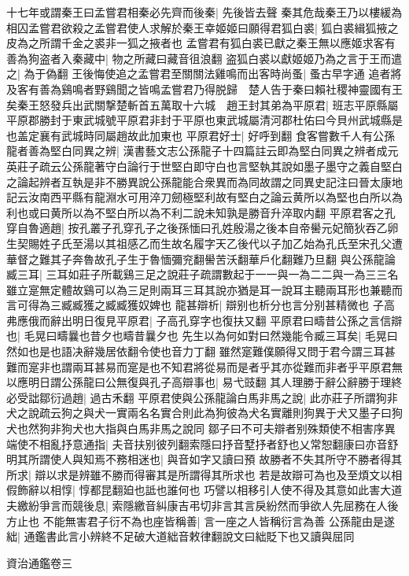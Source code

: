 十七年或謂秦王曰孟嘗君相秦必先齊而後秦|{
	先後皆去聲
	}
秦其危哉秦王乃以樓緩為相囚孟嘗君欲殺之孟嘗君使人求解於秦王幸姬姬曰願得君狐白裘|{
	狐白裘緝狐掖之皮為之所謂千金之裘非一狐之掖者也
	}
孟嘗君有狐白裘已獻之秦王無以應姬求客有善為狗盗者入秦藏中|{
	物之所藏曰藏音徂浪翻
	}
盗狐白裘以獻姬姬乃為之言于王而遣之|{
	為于偽翻
	}
王後悔使追之孟嘗君至關關法雞鳴而出客時尚蚤|{
	蚤古早字通
	}
追者將及客有善為鷄鳴者野鷄聞之皆鳴孟嘗君乃得脱歸　楚人告于秦曰賴社稷神靈國有王矣秦王怒發兵出武關撃楚斬首五萬取十六城　趙王封其弟為平原君|{
	班志平原縣屬平原郡勝封于東武城號平原君非封于平原也東武城屬清河郡杜佑曰今貝州武城縣是也盖定襄有武城時同屬趙故此加東也
	}
平原君好士|{
	好呼到翻
	}
食客嘗數千人有公孫龍者善為堅白同異之辨|{
	漢書藝文志公孫龍子十四篇註云即為堅白同異之辨者成元英莊子疏云公孫龍著守白論行于世堅白即守白也言堅執其說如墨子墨守之義自堅白之論起辨者互執是非不勝異說公孫龍能合衆異而為同故謂之同異史記注曰晉太康地記云汝南西平縣有龍淵水可用淬刀劒極堅利故有堅白之論云黄所以為堅也白所以為利也或曰黄所以為不堅白所以為不利二說未知孰是勝音升淬取内翻
	}
平原君客之孔穿自魯適趙|{
	按孔叢子孔穿孔子之後孫愐曰孔姓殷湯之後本自帝嚳元妃簡狄吞乙卵生契賜姓子氏至湯以其祖感乙而生故名履字天乙後代以子加乙始為孔氏至宋孔父遭華督之難其子奔魯故孔子生于魯愐彌兖翻嚳苦沃翻華戶化翻難乃旦翻
	}
與公孫龍論臧三耳|{
	三耳如莊子所載鷄三足之說莊子疏謂數起于一一與一為二二與一為三三名雖立寔無定體故鷄可以為三足則兩耳三耳其說亦猶是耳一說耳主聽兩耳形也兼聽而言可得為三臧臧獲之臧臧獲奴婢也
	}
龍甚辯析|{
	辯别也析分也言分别甚精微也
	}
子高弗應俄而辭出明日復見平原君|{
	子高孔穿字也復扶又翻
	}
平原君曰疇昔公孫之言信辯也|{
	毛晃曰疇曩也昔夕也疇昔曩夕也
	}
先生以為何如對曰然幾能令臧三耳矣|{
	毛晃曰然如也是也語决辭幾居依翻令使也音力丁翻
	}
雖然寔難僕願得又問于君今謂三耳甚難而寔非也謂兩耳甚易而寔是也不知君將從易而是者乎其亦從難而非者乎平原君無以應明日謂公孫龍曰公無復與孔子高辯事也|{
	易弋豉翻
	}
其人理勝于辭公辭勝于理終必受詘鄒衍過趙|{
	過古禾翻
	}
平原君使與公孫龍論白馬非馬之說|{
	此亦莊子所謂狗非犬之說疏云狗之與犬一實兩名名實合則此為狗彼為犬名實離則狗異于犬又墨子曰狗犬也然狗非狗犬也大指與白馬非馬之說同
	}
鄒子曰不可夫辯者别殊類使不相害序異端使不相亂抒意通指|{
	夫音扶别彼列翻索隱曰抒音墅抒者舒也乂常恕翻康曰亦音舒
	}
明其所謂使人與知焉不務相迷也|{
	與音如字又讀曰預
	}
故勝者不失其所守不勝者得其所求|{
	辯以求是辨雖不勝而得審其是所謂得其所求也
	}
若是故辯可為也及至煩文以相假飾辭以相惇|{
	惇都昆翻廹也詆也誰何也
	}
巧譬以相移引人使不得及其意如此害大道夫繳紛爭言而競後息|{
	索隱繳音糾康吉弔切非言其言戾紛然而爭欲人先屈務在人後方止也
	}
不能無害君子衍不為也座皆稱善|{
	言一座之人皆稱衍言為善
	}
公孫龍由是遂絀|{
	通鑑書此言小辨終不足破大道絀音敕律翻說文曰絀貶下也又讀與屈同
	}


資治通鑑卷三
